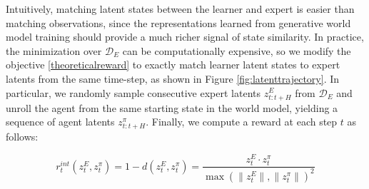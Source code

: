 \documentclass[10pt]{article} %
\theoremstyle{plain}
\newtheorem{lemma}[theorem]{Lemma}
\theoremstyle{definition}
\theoremstyle{remark}
\begin{document}

Intuitively, matching latent states between the learner and expert is easier than matching observations, since the representations learned from generative world model training should provide a much richer signal of state similarity. 
In practice, the minimization over $\mathcal{D}_E$ can be computationally expensive, so we modify the objective \ref{theoreticalreward} to exactly match learner latent states to expert latents from the same time-step, as shown in Figure \ref{fig:latenttrajectory}. In particular, we randomly sample consecutive expert latents $z^E_{t:t+H} $ from $\mathcal{D}_E$ and unroll the agent from the same starting state in the world model, yielding a sequence of agent latents $z^\pi_{t:t+H}$.  Finally, we compute a reward at each step $t$ as follows:

\begin{equation}\label{intreward}
    r^{int}_t(z^E_t, z^\pi_t) = 1 - d(z^E_t ,z^\pi_t) =  \frac{z^E_t \cdot z^\pi_t}{\max(\|z^E_t\|, \|z^\pi_t\|)^2}
\end{equation}
\end{document}

